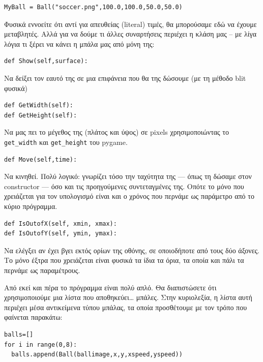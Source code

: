 \begin{verbatim}
MyBall = Ball("soccer.png",100.0,100.0,50.0,50.0)
\end{verbatim}

Φυσικά εννοείτε ότι αντί για απευθείας (literal) τιμές, θα μπορούσαμε
εδώ να έχουμε μεταβλητές. Αλλά για να δούμε τι άλλες συναρτήσεις
περιέχει η κλάση μας -- με λίγα λόγια τι ξέρει να κάνει η μπάλα μας από
μόνη της:

\begin{verbatim}
def Show(self,surface):
\end{verbatim}

Να δείξει τον εαυτό της σε μια επιφάνεια που θα της δώσουμε (με τη μέθοδο
blit φυσικά)

\begin{verbatim}
def GetWidth(self):
def GetHeight(self):
\end{verbatim}

Να μας πει το μέγεθος της (πλάτος και ύψος) σε pixels χρησιμοποιώντας το
{\tt get\_width} και {\tt get\_height} του pygame.

\begin{verbatim}
def Move(self,time):
\end{verbatim}

Να κινηθεί. Πολύ λογικό: γνωρίζει τόσο την ταχύτητα της --- όπως τη δώσαμε
στον constructor --- όσο και τις προηγούμενες συντεταγμένες της. Οπότε το
μόνο που χρειάζεται για τον υπολογισμό είναι και ο χρόνος που περνάμε ως
παράμετρο από το κύριο πρόγραμμα.

\begin{verbatim}
def IsOutofX(self, xmin, xmax):
def IsOutofY(self, ymin, ymax):
\end{verbatim}

Να ελέγξει αν έχει βγει εκτός ορίων της οθόνης, σε οποιοδήποτε από τους
δύο άξονες. Το μόνο έξτρα που χρειάζεται είναι φυσικά τα ίδια τα όρια,
τα οποία και πάλι τα περνάμε ως παραμέτρους.

Από εκεί και πέρα το πρόγραμμα είναι πολύ απλό.
Θα διαπιστώσετε ότι χρησιμοποιούμε μια λίστα που αποθηκεύει\ldots{} μπάλες.
Στην κυριολεξία, η λίστα αυτή περιέχει μέσα αντικείμενα τύπου μπάλας,
τα οποία προσθέτουμε με τον τρόπο που φαίνεται παρακάτω:

\begin{verbatim}
balls=[]
for i in range(0,8):
  balls.append(Ball(ballimage,x,y,xspeed,yspeed))
\end{verbatim}

